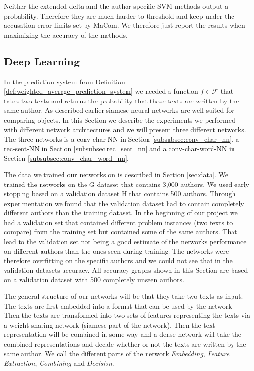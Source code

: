 Neither the extended delta and the author specific \gls{SVM} methods output a
probability. Therefore they are much harder to threshold and keep under the
accusation error limits set by MaCom. We therefore just report the results when
maximizing the accuracy of the methods.


\subsection{Deep Learning}

In the prediction system from Definition
\ref{def:weighted_average_prediction_system} we needed a function $f \in
\mathcal{F}$ that takes two texts and returns the probability that those
texts are written by the same author. As described earlier siamese neural
networks are well suited for comparing objects. In this Section we describe
the experiments we performed with different network architectures and we will
present three different networks. The three networks is a \gls{conv-char-NN}
in Section \ref{subsubsec:conv_char_nn}, a \gls{rec-sent-NN} in Section
\ref{subsubsec:rec_sent_nn} and a \gls{conv-char-word-NN} in Section
\ref{subsubsec:conv_char_word_nn}.

The data we trained our networks on is described in Section \ref{sec:data}. We
trained the networks on the \gls{G} dataset that contains 3,000 authors. We used
early stopping based on a validation dataset \gls{H} that contains 500 authors.
Through experimentation we found that the validation dataset had to contain
completely different authors than the training dataset. In the beginning of
our project we had a validation set that contained different problem instances
(two texts to compare) from the training set but contained some of the same
authors. That lead to the validation set not being a good estimate of the
networks performance on different authors than the ones seen during training.
The networks were therefore overfitting on the specific authors and we could not
see that in the validation datasets accuracy. All accuracy graphs shown in this
Section are based on a validation dataset with 500 completely unseen authors.

The general structure of our networks will be that they take two texts as input.
The texts are first embedded into a format that can be used by the network.
Then the texts are transformed into two sets of features representing the texts
via a weight sharing network (siamese part of the network). Then the text
representation will be combined in some way and a dense network will take the
combined representations and decide whether or not the texts are written by the
same author. We call the different parts of the network \textit{Embedding},
\textit{Feature Extraction}, \textit{Combining} and \textit{Decision}.

